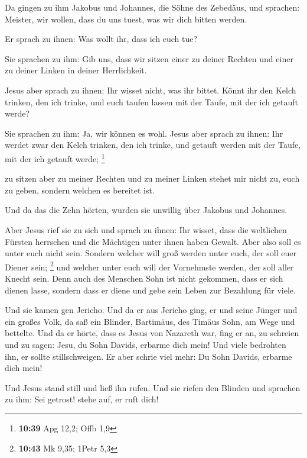  Da gingen zu ihm Jakobus und Johannes, die Söhne des
Zebedäus, und sprachen: Meister, wir wollen, dass du uns tuest, was wir
dich bitten werden.

 Er sprach zu ihnen: Was wollt ihr, dass ich euch tue?

 Sie sprachen zu ihm: Gib uns, dass wir sitzen einer zu
deiner Rechten und einer zu deiner Linken in deiner Herrlichkeit.

 Jesus aber sprach zu ihnen: Ihr wisset nicht, was ihr
bittet. Könnt ihr den Kelch trinken, den ich trinke, und euch taufen
lassen mit der Taufe, mit der ich getauft werde?

 Sie sprachen zu ihm: Ja, wir können es wohl. Jesus aber
sprach zu ihnen: Ihr werdet zwar den Kelch trinken, den ich trinke, und
getauft werden mit der Taufe, mit der ich getauft werde; \footnote{\textbf{10:39}
  Apg 12,2; Offb 1,9}

 zu sitzen aber zu meiner Rechten und zu meiner Linken
stehet mir nicht zu, euch zu geben, sondern welchen es bereitet ist.

 Und da das die Zehn hörten, wurden sie unwillig über
Jakobus und Johannes.

 Aber Jesus rief sie zu sich und sprach zu ihnen: Ihr
wisset, dass die weltlichen Fürsten herrschen und die Mächtigen unter
ihnen haben Gewalt.  Aber also soll es unter euch nicht
sein. Sondern welcher will groß werden unter euch, der soll euer Diener
sein; \footnote{\textbf{10:43} Mk 9,35; 1Petr 5,3}  und
welcher unter euch will der Vornehmste werden, der soll aller Knecht
sein.  Denn auch des Menschen Sohn ist nicht gekommen,
dass er sich dienen lasse, sondern dass er diene und gebe sein Leben zur
Bezahlung für viele.

 Und sie kamen gen Jericho. Und da er aus Jericho ging,
er und seine Jünger und ein großes Volk, da saß ein Blinder, Bartimäus,
des Timäus Sohn, am Wege und bettelte.  Und da er hörte,
dass es Jesus von Nazareth war, fing er an, zu schreien und zu sagen:
Jesu, du Sohn Davids, erbarme dich mein!  Und viele
bedrohten ihn, er sollte stillschweigen. Er aber schrie viel mehr: Du
Sohn Davids, erbarme dich mein!

 Und Jesus stand still und ließ ihn rufen. Und sie riefen
den Blinden und sprachen zu ihm: Sei getrost! stehe auf, er ruft dich!


